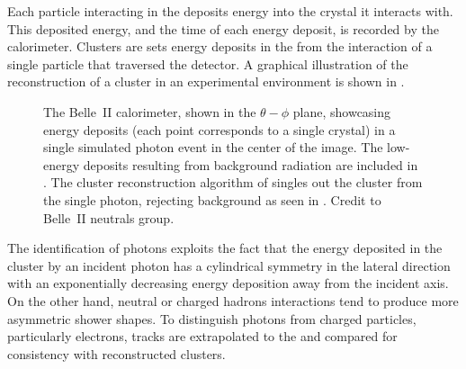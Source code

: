 Each particle interacting in the \ECL deposits energy into the crystal it interacts with.
This deposited energy, and the time of each energy deposit, is recorded by the calorimeter.
Clusters are sets energy deposits in the \ECL from the interaction of a single particle that traversed the detector.
A graphical illustration of the reconstruction of a cluster in an experimental environment is shown in .
\begin{figure}[htbp!]
    \caption{\label{fig:clustering}
    The Belle~II calorimeter, shown in the $\theta-\phi$ plane, 
    showcasing energy deposits (each point corresponds to a single \ECL crystal) in a single simulated photon event in the center of the image.
    The low-energy deposits resulting from background radiation are included in .
    The cluster reconstruction algorithm of \basftwo singles out the cluster from the single photon, rejecting background as seen in .
    Credit to Belle~II neutrals group.
    }
\end{figure}

The identification of photons exploits the fact that the energy deposited in the cluster
by an incident photon has a cylindrical symmetry in the lateral direction with an exponentially decreasing energy deposition away from the incident axis.
On the other hand, neutral or charged hadrons interactions tend to produce more asymmetric shower shapes.
To distinguish photons from charged particles, particularly electrons, tracks are extrapolated to the \ECL and compared for consistency with reconstructed clusters.
